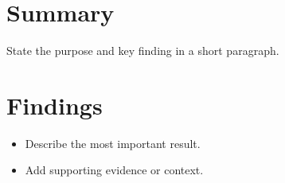 \section*{Summary}
State the purpose and key finding in a short paragraph.

\section*{Findings}
\begin{itemize}
  \item Describe the most important result.
  \item Add supporting evidence or context.
\end{itemize}
